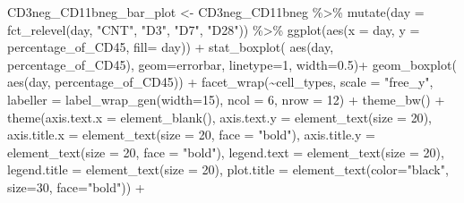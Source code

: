 \documentclass[
]{book}
\newenvironment{Shaded}{\begin{snugshade}}{\end{snugshade}}
\newcommand{\AttributeTok}[1]{\textcolor[rgb]{0.77,0.63,0.00}{#1}}
\newcommand{\DecValTok}[1]{\textcolor[rgb]{0.00,0.00,0.81}{#1}}
\newcommand{\FloatTok}[1]{\textcolor[rgb]{0.00,0.00,0.81}{#1}}
\newcommand{\FunctionTok}[1]{\textcolor[rgb]{0.00,0.00,0.00}{#1}}
\newcommand{\NormalTok}[1]{#1}
\newcommand{\OtherTok}[1]{\textcolor[rgb]{0.56,0.35,0.01}{#1}}
\newcommand{\SpecialCharTok}[1]{\textcolor[rgb]{0.00,0.00,0.00}{#1}}
\newcommand{\StringTok}[1]{\textcolor[rgb]{0.31,0.60,0.02}{#1}}
\begin{document}
\begin{Shaded}
\begin{Highlighting}[]
\NormalTok{CD3neg\_CD11bneg\_bar\_plot }\OtherTok{\textless{}{-}}\NormalTok{ CD3neg\_CD11bneg }\SpecialCharTok{\%\textgreater{}\%}
\FunctionTok{mutate}\NormalTok{(}\AttributeTok{day =} \FunctionTok{fct\_relevel}\NormalTok{(day, }
            \StringTok{"CNT"}\NormalTok{, }\StringTok{"D3"}\NormalTok{, }\StringTok{"D7"}\NormalTok{, }
            \StringTok{"D28"}\NormalTok{)) }\SpecialCharTok{\%\textgreater{}\%}
  \FunctionTok{ggplot}\NormalTok{(}\FunctionTok{aes}\NormalTok{(}\AttributeTok{x =}\NormalTok{ day, }\AttributeTok{y =}\NormalTok{ percentage\_of\_CD45, }\AttributeTok{fill=}\NormalTok{ day)) }\SpecialCharTok{+}
  \FunctionTok{stat\_boxplot}\NormalTok{( }\FunctionTok{aes}\NormalTok{(day, percentage\_of\_CD45), }
    \AttributeTok{geom=}\StringTok{\textquotesingle{}errorbar\textquotesingle{}}\NormalTok{, }\AttributeTok{linetype=}\DecValTok{1}\NormalTok{, }\AttributeTok{width=}\FloatTok{0.5}\NormalTok{)}\SpecialCharTok{+}  
  \FunctionTok{geom\_boxplot}\NormalTok{( }\FunctionTok{aes}\NormalTok{(day, percentage\_of\_CD45)) }\SpecialCharTok{+} 
  \FunctionTok{facet\_wrap}\NormalTok{(}\SpecialCharTok{\textasciitilde{}}\NormalTok{cell\_types, }\AttributeTok{scale =} \StringTok{"free\_y"}\NormalTok{, }\AttributeTok{labeller =} \FunctionTok{label\_wrap\_gen}\NormalTok{(}\AttributeTok{width=}\DecValTok{15}\NormalTok{), }\AttributeTok{ncol =} \DecValTok{6}\NormalTok{, }\AttributeTok{nrow =} \DecValTok{12}\NormalTok{) }\SpecialCharTok{+} 
  \FunctionTok{theme\_bw}\NormalTok{() }\SpecialCharTok{+} 
  \FunctionTok{theme}\NormalTok{(}\AttributeTok{axis.text.x =} \FunctionTok{element\_blank}\NormalTok{(), }\AttributeTok{axis.text.y =} \FunctionTok{element\_text}\NormalTok{(}\AttributeTok{size =} \DecValTok{20}\NormalTok{), }
        \AttributeTok{axis.title.x =} \FunctionTok{element\_text}\NormalTok{(}\AttributeTok{size =} \DecValTok{20}\NormalTok{, }\AttributeTok{face =} \StringTok{"bold"}\NormalTok{), }
        \AttributeTok{axis.title.y =} \FunctionTok{element\_text}\NormalTok{(}\AttributeTok{size =} \DecValTok{20}\NormalTok{, }\AttributeTok{face =} \StringTok{"bold"}\NormalTok{), }
        \AttributeTok{legend.text =} \FunctionTok{element\_text}\NormalTok{(}\AttributeTok{size =} \DecValTok{20}\NormalTok{), }
        \AttributeTok{legend.title =} \FunctionTok{element\_text}\NormalTok{(}\AttributeTok{size =} \DecValTok{20}\NormalTok{), }
        \AttributeTok{plot.title =} \FunctionTok{element\_text}\NormalTok{(}\AttributeTok{color=}\StringTok{"black"}\NormalTok{, }\AttributeTok{size=}\DecValTok{30}\NormalTok{, }\AttributeTok{face=}\StringTok{"bold"}\NormalTok{)) }\SpecialCharTok{+} 

\end{Highlighting}
\end{Shaded}
\end{document}
